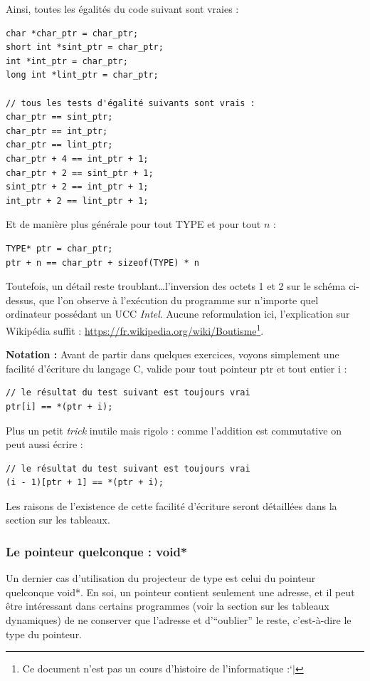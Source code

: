 \documentclass[../../../main.tex]{subfiles}
\begin{document}
Ainsi, toutes les égalités du code suivant sont vraies :
\begin{verbatim}
char *char_ptr = char_ptr;
short int *sint_ptr = char_ptr;
int *int_ptr = char_ptr;
long int *lint_ptr = char_ptr;

// tous les tests d'égalité suivants sont vrais :
char_ptr == sint_ptr;
char_ptr == int_ptr;
char_ptr == lint_ptr;
char_ptr + 4 ==	int_ptr + 1;
char_ptr + 2 == sint_ptr + 1;
sint_ptr + 2 == int_ptr + 1;
int_ptr + 2 == lint_ptr + 1;
\end{verbatim}
Et de manière plus générale pour tout \textsf{TYPE} et pour tout $n$ :
\begin{verbatim}
TYPE* ptr = char_ptr;
ptr + n == char_ptr + sizeof(TYPE) * n
\end{verbatim}
Toutefois, un détail reste troublant\dots l'inversion des octets 1 et 2 sur le schéma ci-dessus, que l'on observe à l'exécution du programme sur n'importe quel ordinateur possédant un UCC \textit{Intel}. 
Aucune reformulation ici, l'explication sur Wikipédia suffit : \url{https://fr.wikipedia.org/wiki/Boutisme}\footnote{Ce document n'est pas un cours d'histoire de l'informatique :`$|$}.
 
\textbf{Notation :} Avant de partir dans quelques exercices, voyons simplement une facilité d'écriture du langage C, valide pour tout pointeur \textsf{ptr} et tout entier \textsf{i} :
\begin{verbatim}
// le résultat du test suivant est toujours vrai
ptr[i] == *(ptr + i);
\end{verbatim}
Plus un petit \textit{trick} inutile mais rigolo : comme l'addition est commutative on peut aussi écrire :
\begin{verbatim}
// le résultat du test suivant est toujours vrai
(i - 1)[ptr + 1] == *(ptr + i);
\end{verbatim}
Les raisons de l'existence de cette facilité d'écriture seront détaillées dans la section sur les tableaux.
\subsubsection{Le pointeur quelconque : \textsf{void*}}
Un dernier cas d'utilisation du projecteur de type est celui du pointeur quelconque \textsf{void*}. En soi, un pointeur contient seulement une adresse, et il peut être intéressant dans certains programmes (voir la section sur les tableaux dynamiques) de ne conserver que l'adresse et d'``oublier'' le reste, c'est-à-dire le type du pointeur.
 
\end{document}
